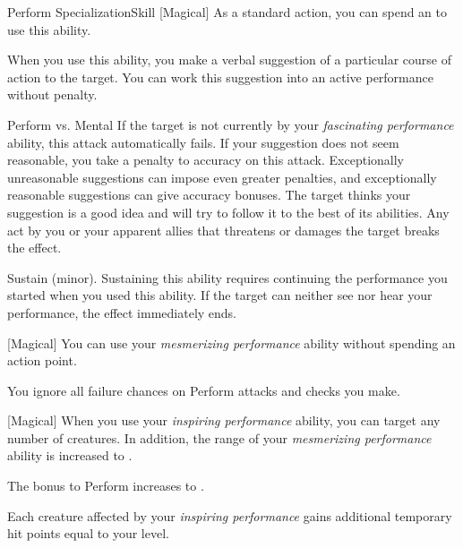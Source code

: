 \begin{feat}{Perform Specialization}{Skill}
        [Magical] As a standard action, you can spend an  to use this ability.
        \begin{ability}
            \begin{spelltargetinginfo}
            \end{spelltargetinginfo}
            \begin{spelleffects}
                \spellspecial When you use this ability, you make a verbal suggestion of a particular course of action to the target.
                You can work this suggestion into an active performance without penalty.
                \begin{spellattack}{Perform vs. Mental}
                    \spellspecial If the target is not currently \fascinated by your \textit{fascinating performance} ability, this attack automatically fails.
                    If your suggestion does not seem reasonable, you take a  penalty to accuracy on this attack.
                    Exceptionally unreasonable suggestions can impose even greater penalties, and exceptionally reasonable suggestions can give accuracy bonuses.
                    \spellsuccess The target thinks your suggestion is a good idea and will try to follow it to the best of its abilities.
                    Any act by you or your apparent allies that threatens or damages the target breaks the effect.
                \end{spellattack}
                \spelldur Sustain (minor). Sustaining this ability requires continuing the performance you started when you used this ability. If the target can neither see nor hear your performance, the effect immediately ends.
            \end{spelleffects}
        \end{ability}

        [Magical] You can use your \textit{mesmerizing performance} ability without spending an action point.

         You ignore all failure chances on Perform attacks and checks you make.

        [Magical] When you use your \textit{inspiring performance} ability, you can target any number of creatures.
        In addition, the range of your \textit{mesmerizing performance} ability is increased to \rnglong.

         The bonus to Perform increases to .


         Each creature affected by your \textit{inspiring performance} gains additional temporary hit points equal to your level.
    \end{feat}

